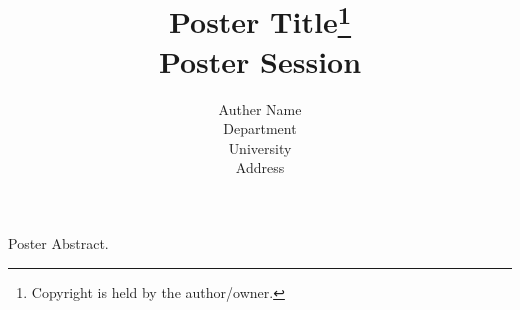 \documentclass{article}
\title{Poster Title\footnote{
Copyright is held by the author/owner.}\\
\vspace{0.2in}
\large Poster Session\\}
\author{
Auther Name\\
Department\\
University\\
Address\\
\email{name@email.edu}
}
\begin{document}
\maketitle

Poster Abstract.
\end{document}
